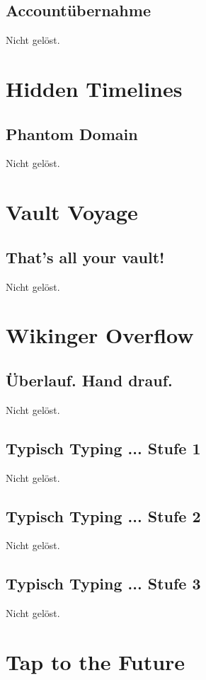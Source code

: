 \documentclass[12pt, a4paper, titlepage, oneside]{scrartcl}
\begin{document}
	\subsection{Accountübernahme}
	Nicht gelöst.

	\section{Hidden Timelines}

	\subsection{Phantom Domain}
	Nicht gelöst.

	\section{Vault Voyage}

	\subsection{That's all your vault!}
	Nicht gelöst.

	\section{Wikinger Overflow}

	\subsection{\"Uberlauf. Hand drauf.}
	Nicht gelöst.

	\subsection{Typisch Typing ... Stufe 1}
	Nicht gelöst.

	\subsection{Typisch Typing ... Stufe 2}
	Nicht gelöst.

	\subsection{Typisch Typing ... Stufe 3}
	Nicht gelöst.

	\section{Tap to the Future}
\end{document}
